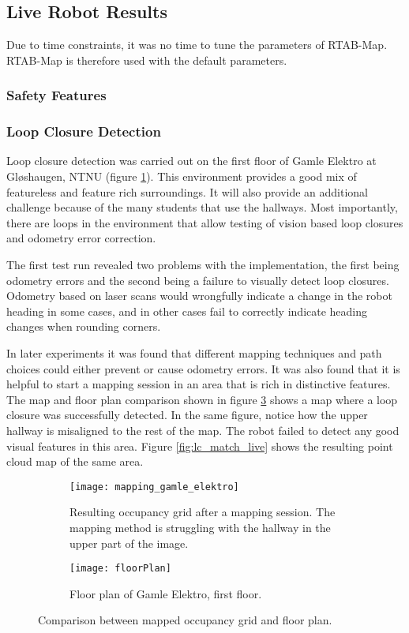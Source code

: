 \subsection{Live Robot Results}

Due to time constraints, it was no time to tune the parameters of \ac{RTAB-Map}. \ac{RTAB-Map} is therefore used with the default parameters. 

\subsubsection{Safety Features}


\subsubsection{Loop Closure Detection}

Loop closure detection was carried out on the first floor of Gamle Elektro at Gløshaugen, NTNU (figure \ref{fig:mapping_gamle_elektro}). This environment provides a good mix of featureless and feature rich surroundings. It will also provide an additional challenge because of the many students that use the hallways. Most importantly, there are loops in the environment that allow testing of vision based loop closures and odometry error correction. 

The first test run revealed two problems with the implementation, the first being odometry errors and the second being a failure to visually detect loop closures. Odometry based on laser scans would wrongfully indicate a change in the robot heading in some cases, and in other cases fail to correctly indicate heading changes when rounding corners. 

In later experiments it was found that different mapping techniques and path choices could either prevent or cause odometry errors. It was also found that it is helpful to start a mapping session in an area that is rich in distinctive features. The map and floor plan comparison shown in figure \ref{fig:comparison} shows a map where a loop closure was successfully detected. In the same figure, notice how the upper hallway is misaligned to the rest of the map. The robot failed to detect any good visual features in this area. Figure \ref{fig:lc_match_live} shows the resulting point cloud map of the same area.

\begin{figure}
	\centering
	\begin{subfigure}[b]{1\textwidth}
		\texttt{[image: mapping\_gamle\_elektro]}
		\caption{Resulting occupancy grid after a mapping session. The mapping  method is struggling with the  hallway in the upper part of the image.}
		\label{fig:mapping_gamle_elektro}
	\end{subfigure}
	\begin{subfigure}[b]{1\textwidth}
		\texttt{[image: floorPlan]}
		\caption{Floor plan of Gamle Elektro, first floor.}
		\label{fig:floorPlan}
	\end{subfigure}
	\caption{Comparison between mapped occupancy grid and floor plan.}\label{fig:comparison}
\end{figure}



